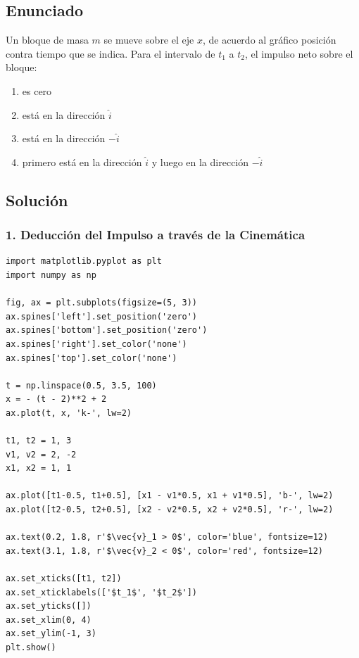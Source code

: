 \documentclass[12pt, a4paper]{article}
\begin{document}
\newpage

\subsection*{Enunciado}
Un bloque de masa $m$ se mueve sobre el eje $x$, de acuerdo al gráfico posición contra tiempo que se indica. Para el intervalo de $t_1$ a $t_2$, el impulso neto sobre el bloque:

\begin{center}
\end{center}

\begin{enumerate}[label=\alph*)]
    \item es cero
    \item está en la dirección $\hat{i}$
    \item está en la dirección $-\hat{i}$
    \item primero está en la dirección $\hat{i}$ y luego en la dirección $-\hat{i}$
\end{enumerate}

\subsection*{Solución}

\subsubsection*{1. Deducción del Impulso a través de la Cinemática}

\begin{verbatim}
import matplotlib.pyplot as plt
import numpy as np

fig, ax = plt.subplots(figsize=(5, 3))
ax.spines['left'].set_position('zero')
ax.spines['bottom'].set_position('zero')
ax.spines['right'].set_color('none')
ax.spines['top'].set_color('none')

t = np.linspace(0.5, 3.5, 100)
x = - (t - 2)**2 + 2
ax.plot(t, x, 'k-', lw=2)

t1, t2 = 1, 3
v1, v2 = 2, -2
x1, x2 = 1, 1

ax.plot([t1-0.5, t1+0.5], [x1 - v1*0.5, x1 + v1*0.5], 'b-', lw=2)
ax.plot([t2-0.5, t2+0.5], [x2 - v2*0.5, x2 + v2*0.5], 'r-', lw=2)

ax.text(0.2, 1.8, r'$\vec{v}_1 > 0$', color='blue', fontsize=12)
ax.text(3.1, 1.8, r'$\vec{v}_2 < 0$', color='red', fontsize=12)

ax.set_xticks([t1, t2])
ax.set_xticklabels(['$t_1$', '$t_2$'])
ax.set_yticks([])
ax.set_xlim(0, 4)
ax.set_ylim(-1, 3)
plt.show()
\end{verbatim}
\end{document}
